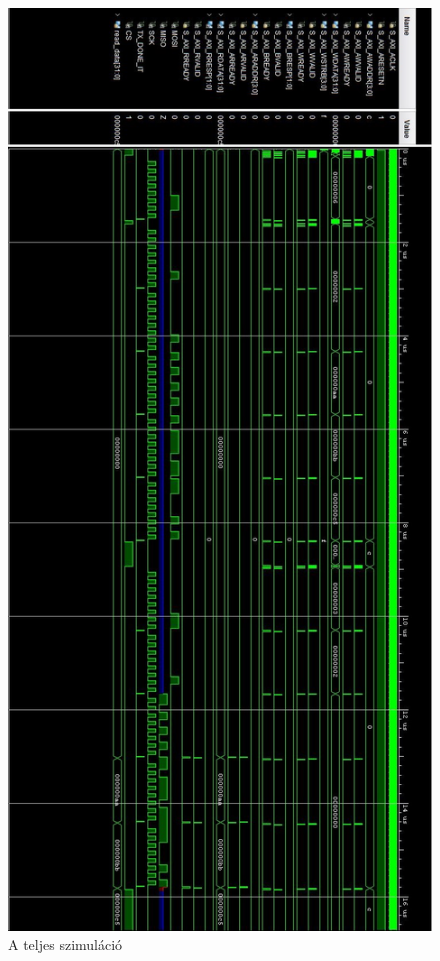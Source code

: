 \documentclass[a4paper,11pt]{article}
\begin{document}
\begin{figure}[H]
	\begin{center}
	\includegraphics[scale=0.6]{sim_complete.JPG}
	\caption{A teljes szimuláció}
	\label{fig:sim_complete}
	\end{center}
\end{figure}
\end{document}
